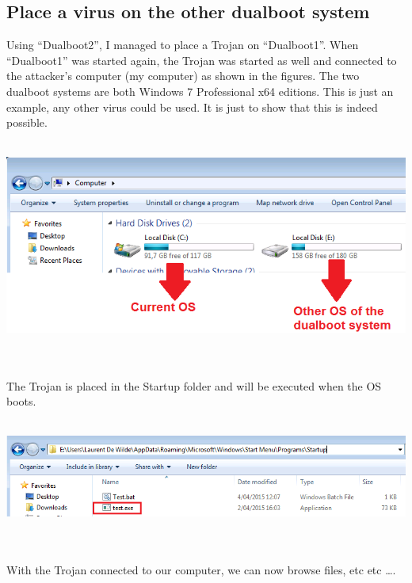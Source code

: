 \documentclass[11pt, a4paper]{article}
\begin{document}
\subsection*{Place a virus on the other dualboot system}

Using ``Dualboot2'', I managed to place a Trojan on ``Dualboot1''. When ``Dualboot1'' was started again, the Trojan was started as well and connected to the attacker's computer (my computer) as shown in the figures. The two dualboot systems are both Windows 7 Professional x64 editions. This is just an example, any other virus could be used. It is just to show that this is indeed possible.
$\;$ \\ \\
\noindent\begin{minipage}{\textwidth}
    \centering
    \includegraphics[width=\textwidth]{Hack_3.png}
\end{minipage}
$\;$ \\ \\
The Trojan is placed in the Startup folder and will be executed when the OS boots. \\ \\
\noindent\begin{minipage}{\textwidth}
    \centering
    \includegraphics[width=\textwidth]{Hack_1.png}
\end{minipage}
$\;$ \\ \\
With the Trojan connected to our computer, we can now browse files, etc etc \ldots . \\ \\
\end{document}

